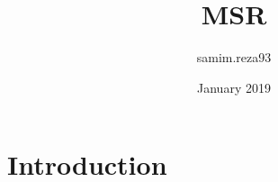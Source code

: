 \documentclass{article}
\title{MSR}
\author{samim.reza93 }
\date{January 2019}
\begin{document}
\maketitle

\section{Introduction}
\end{document}
